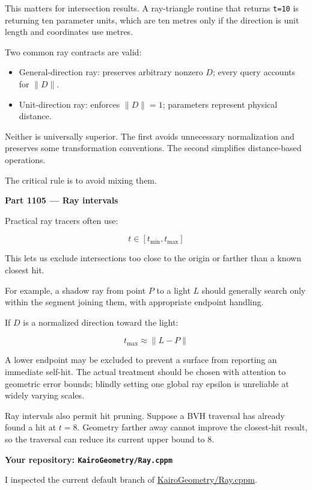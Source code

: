 This matters for intersection results. A ray-triangle routine that returns \texttt{t=10} is returning ten parameter units, which are ten metres only if the direction is unit length and coordinates use metres.

Two common ray contracts are valid:

\begin{itemize}
\tightlist
\item
  General-direction ray: preserves arbitrary nonzero \(D\); every query accounts for \(\|D\|\).
\item
  Unit-direction ray: enforces \(\|D\|=1\); parameters represent physical distance.
\end{itemize}

Neither is universally superior. The first avoids unnecessary normalization and preserves some transformation conventions. The second simplifies distance-based operations.

The critical rule is to avoid mixing them.

\textbf{Part 1105 --- Ray intervals}

Practical ray tracers often use:

\[
t\in[t_{\min},t_{\max}]
\]

This lets us exclude intersections too close to the origin or farther than a known closest hit.

For example, a shadow ray from point \(P\) to a light \(L\) should generally search only within the segment joining them, with appropriate endpoint handling.

If \(D\) is a normalized direction toward the light:

\[
t_{\max}\approx\|L-P\|
\]

A lower endpoint may be excluded to prevent a surface from reporting an immediate self-hit. The actual treatment should be chosen with attention to geometric error bounds; blindly setting one global ray epsilon is unreliable at widely varying scales.

Ray intervals also permit hit pruning. Suppose a BVH traversal has already found a hit at \(t=8\). Geometry farther away cannot improve the closest-hit result, so the traversal can reduce its current upper bound to \(8\).

\textbf{Your repository: \texttt{KairoGeometry/Ray.cppm}}

I inspected the current default branch of \href{https://github.com/swayam8624/KairoGeometry/blob/master/Ray.cppm?utm_source=chatgpt.com}{KairoGeometry/Ray.cppm}.

